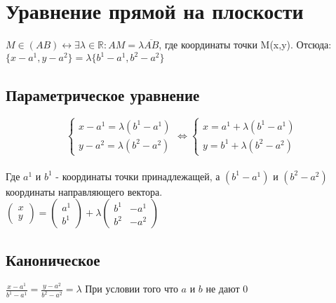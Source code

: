\documentclass{book}
\begin{document}
\chapter{Уравнение прямой на плоскости}
$M \in (AB) \longleftrightarrow \exists \lambda \in \mathbb{R} : AM = \lambda\overline{AB}$, где координаты точки M(x,y).
Отсюда: $\{x-a^1,y-a^2\}=\lambda\{b^1-a^1,b^2-a^2\}$
\begin{figure}[h!]
\end{figure}
\section{Параметрическое уравнение}

\begin{equation}
    \begin{cases}
      x-a^1=\lambda(b^1-a^1)\\
      y-a^2=\lambda(b^2-a^2)
    \end{cases}
\Leftrightarrow
    \begin{cases}
      x=a^1+\lambda(b^1-a^1)\\
      y=b^1+\lambda(b^2-a^2) 
    \end{cases}
\end{equation}\\

Где $a^1$ и $b^1$ - координаты точки принадлежащей, а $(b^1-a^1)$ и $(b^2-a^2)$ координаты направляющего вектора.\\
$
    \begin{pmatrix}
        {x}\\
        {y}
    \end{pmatrix}
 = 
\begin{pmatrix}
    {a^1}\\
    {b^1}
\end{pmatrix} + \lambda
\begin{pmatrix}
    {b^1} & {-a^1}\\
    {b^2} & {-a^2}
\end{pmatrix}$\\
\section{Каноническое}
$\frac{x-a^1}{b^1-a^1}=\frac{y-a^2}{b^2-a^2}=\lambda$ При условии того что $a$ и $b$ не дают 0\\
\end{document}
